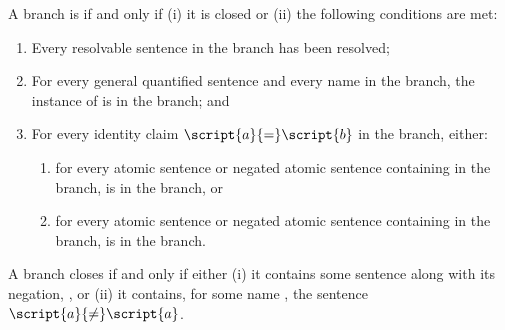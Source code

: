 A branch is  if and only if (i) it is closed or (ii) the following conditions are met:
\begin{enumerate}
\item Every resolvable sentence in the branch has been resolved;
\item For every general quantified sentence \metaA{} and every name  in the branch, the  instance of \metaA{} is in the branch; and
\item For every identity claim $\script{a}{=}\script{b}$ in the branch, either:
	\begin{enumerate}
	\item for every atomic sentence or negated atomic sentence \metaA{} containing  in the branch, \metaA{} is in the branch, or 
	\item for every atomic sentence or negated atomic sentence \metaA{} containing  in the branch, \metaA{} is in the branch.
	\end{enumerate}
\end{enumerate}

A branch closes if and only if either (i) it contains some sentence \metaA{} along with its negation, \enot\metaA{}, or (ii) it contains, for some name , the sentence $\script{a}{\neq}\script{a}$.
\newpage

